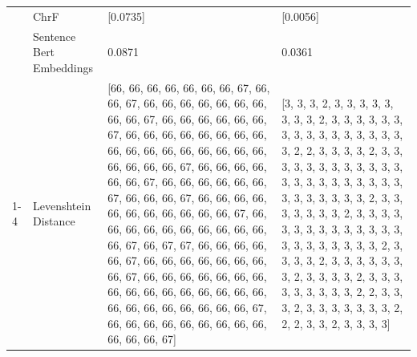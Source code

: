 \begin{tabular}{llll}
 & ChrF & [0.0735] & [0.0056] \\
 & Sentence Bert Embeddings & 0.0871 & 0.0361 \\
\cline{1-4}
\multirow[t]{4}{*}{Bwoyo kya enju, oyinza okusazamu omukka?} & Levenshtein Distance & [66, 66, 66, 66, 66, 66, 66, 67, 66, 66, 67, 66, 66, 66, 66, 66, 66, 66, 66, 66, 67, 66, 66, 66, 66, 66, 66, 67, 66, 66, 66, 66, 66, 66, 66, 66, 66, 66, 66, 66, 66, 66, 66, 66, 66, 66, 66, 66, 66, 67, 66, 66, 66, 66, 66, 66, 67, 66, 66, 66, 66, 66, 66, 67, 66, 66, 66, 67, 66, 66, 66, 66, 66, 66, 66, 66, 66, 66, 66, 67, 66, 66, 66, 66, 66, 66, 66, 66, 66, 66, 66, 67, 66, 67, 67, 66, 66, 66, 66, 66, 67, 66, 66, 66, 66, 66, 66, 66, 66, 67, 66, 66, 66, 66, 66, 66, 66, 66, 66, 66, 66, 66, 66, 66, 66, 66, 66, 66, 66, 66, 66, 66, 66, 66, 67, 66, 66, 66, 66, 66, 66, 66, 66, 66, 66, 66, 66, 67] & [3, 3, 3, 2, 3, 3, 3, 3, 3, 3, 3, 3, 2, 3, 3, 3, 3, 3, 3, 3, 3, 3, 3, 3, 3, 3, 3, 3, 3, 3, 2, 2, 3, 3, 3, 3, 2, 3, 3, 3, 3, 3, 3, 3, 3, 3, 3, 3, 3, 3, 3, 3, 3, 3, 3, 3, 3, 3, 3, 3, 3, 3, 3, 3, 3, 3, 2, 3, 3, 3, 3, 3, 3, 3, 2, 3, 3, 3, 3, 3, 3, 3, 3, 3, 3, 3, 3, 3, 3, 3, 3, 3, 3, 3, 3, 3, 3, 2, 3, 3, 3, 3, 2, 3, 3, 3, 3, 3, 3, 3, 2, 3, 3, 3, 3, 2, 3, 3, 3, 3, 3, 3, 3, 3, 3, 2, 2, 3, 3, 3, 2, 3, 3, 3, 3, 3, 3, 3, 2, 2, 2, 3, 3, 2, 3, 3, 3, 3] \\

\end{tabular}
